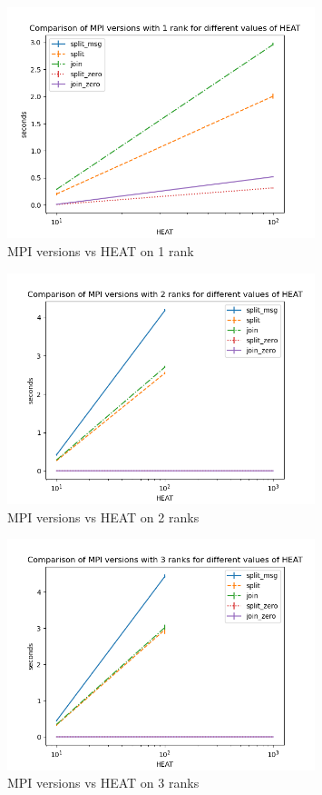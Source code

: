 \documentclass[a4paper]{article}
\begin{document}
\begin{figure}[H]
    \centering
    \includegraphics[width = 0.8\textwidth]{graphs/heat/Comparison of MPI versions with 1 rank for different values of HEAT.png}
    \caption{MPI versions vs HEAT on 1 rank}
    \label{fig: orig heat}
\end{figure}

\begin{figure}[H]
    \centering
    \includegraphics[width = 0.8\textwidth]{graphs/heat/Comparison of MPI versions with 2 ranks for different values of HEAT.png}
    \caption{MPI versions vs HEAT on 2 ranks}
    \label{fig: orig heat}
\end{figure}

\begin{figure}[H]
    \centering
    \includegraphics[width = 0.8\textwidth]{graphs/heat/Comparison of MPI versions with 3 ranks for different values of HEAT.png}
    \caption{MPI versions vs HEAT on 3 ranks}
    \label{fig: orig heat}
\end{figure}
\end{document}
